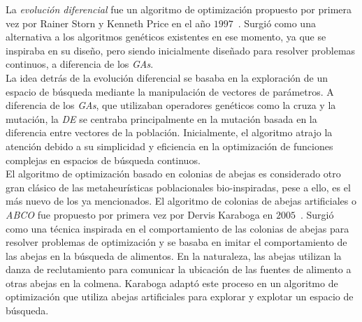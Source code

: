 La \textit{evolución diferencial} fue un algoritmo de optimización propuesto por primera vez por Rainer Storn y Kenneth Price en el año $1997$~\cite{storn_differential_1997}. Surgió como una alternativa a los algoritmos genéticos existentes en ese momento, ya que se inspiraba en su diseño, pero siendo inicialmente diseñado para resolver problemas continuos, a diferencia de los \textit{GAs}.\\[6pt]
La idea detrás de la evolución diferencial se basaba en la exploración de un espacio de búsqueda mediante la manipulación de vectores de parámetros. A diferencia de los \textit{GAs}, que utilizaban operadores genéticos como la cruza y la mutación, la \textit{DE} se centraba principalmente en la mutación basada en la diferencia entre vectores de la población. Inicialmente, el algoritmo atrajo la atención debido a su simplicidad y eficiencia en la optimización de funciones complejas en espacios de búsqueda continuos.\\[6pt]
El algoritmo de optimización basado en colonias de abejas es considerado otro gran clásico de las metaheurísticas poblacionales bio-inspiradas, pese a ello, es el más nuevo de los ya mencionados. El algoritmo de colonias de abejas artificiales o \textit{ABCO} fue propuesto por primera vez por Dervis Karaboga en $2005$~\cite{karaboga_idea_nodate}. Surgió como una técnica inspirada en el comportamiento de las colonias de abejas para resolver problemas de optimización y se basaba en imitar el comportamiento de las abejas en la búsqueda de alimentos. En la naturaleza, las abejas utilizan la danza de reclutamiento para comunicar la ubicación de las fuentes de alimento a otras abejas en la colmena. Karaboga adaptó este proceso en un algoritmo de optimización que utiliza abejas artificiales para explorar y explotar un espacio de búsqueda.

